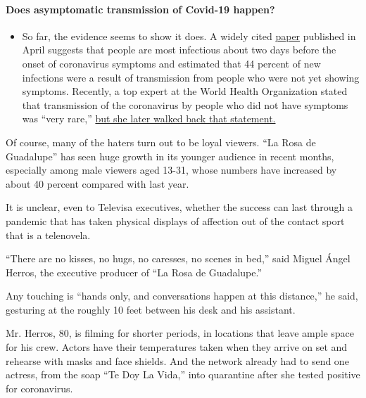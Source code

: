 \begin{itemize}
{  \paragraph{Does asymptomatic transmission of Covid-19
  happen?}\label{does-asymptomatic-transmission-of-covid-19-happen}}

  \begin{itemize}
  \tightlist
  \item
    So far, the evidence seems to show it does. A widely cited
    \href{https://www.nature.com/articles/s41591-020-0869-5}{paper}
    published in April suggests that people are most infectious about
    two days before the onset of coronavirus symptoms and estimated that
    44 percent of new infections were a result of transmission from
    people who were not yet showing symptoms. Recently, a top expert at
    the World Health Organization stated that transmission of the
    coronavirus by people who did not have symptoms was ``very rare,''
    \href{https://www.nytimes3xbfgragh.onion/2020/06/09/world/coronavirus-updates.html?action=click\&pgtype=Article\&state=default\&region=MAIN_CONTENT_3\&context=storylines_faq\#link-1f302e21}{but
    she later walked back that statement.}
  \end{itemize}
\end{itemize}

Of course, many of the haters turn out to be loyal viewers. ``La Rosa de
Guadalupe'' has seen huge growth in its younger audience in recent
months, especially among male viewers aged 13-31, whose numbers have
increased by about 40 percent compared with last year.

It is unclear, even to Televisa executives, whether the success can last
through a pandemic that has taken physical displays of affection out of
the contact sport that is a telenovela.

``There are no kisses, no hugs, no caresses, no scenes in bed,'' said
Miguel Ángel Herros, the executive producer of ``La Rosa de Guadalupe.''

Any touching is ``hands only, and conversations happen at this
distance,'' he said, gesturing at the roughly 10 feet between his desk
and his assistant.

Mr. Herros, 80, is filming for shorter periods, in locations that leave
ample space for his crew. Actors have their temperatures taken when they
arrive on set and rehearse with masks and face shields. And the network
already had to send one actress, from the soap ``Te Doy La Vida,'' into
quarantine after she tested positive for coronavirus.

